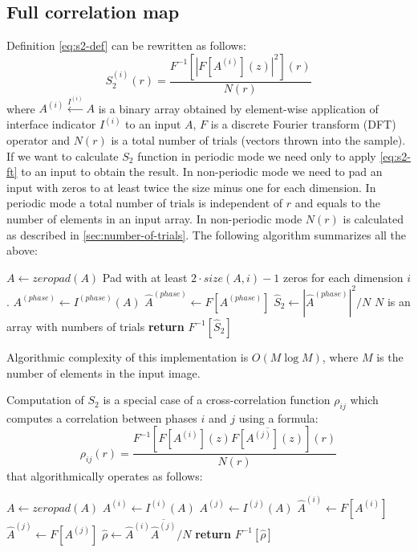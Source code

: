 \documentclass[1p]{elsarticle}
\begin{document}
\subsection{Full correlation map}
\label{sec:map}
Definition \cref{eq:s2-def} can be rewritten as follows:
\begin{equation}
  S_2^{(i)}(r) = \frac{F^{-1} [|F [A^{(i)}](z)|^2] (r)}{N(r)} \label{eq:s2-ft}
\end{equation}
where $A^{(i)} \xleftarrow{I^{(i)}} A$ is a binary array obtained by element-wise
application of interface indicator $I^{(i)}$ to an input $A$, $F$ is a discrete
Fourier transform (DFT) operator and $N(r)$ is a total number of trials (vectors
thrown into the sample). If we want to calculate $S_2$ function in periodic mode
we need only to apply \cref{eq:s2-ft} to an input to obtain the result. In
non-periodic mode we need to pad an input with zeros to at least twice the size
minus one for each dimension. In periodic mode a total number of trials is
independent of $r$ and equals to the number of elements in an input array. In
non-periodic mode $N(r)$ is calculated as described in
\cref{sec:number-of-trials}. The following algorithm summarizes all the above:
\begin{algorithmic}[1]
  \State $A \gets zeropad(A)$
  \Comment Pad with at least $2\cdot size(A, i) - 1$ zeros for each dimension $i$.
  \EndIf
  \State $A^{(phase)} \gets I^{(phase)} (A)$
  \State $\hat{A}^{(phase)} \gets F[A^{(phase)}]$
  \State $\hat{S}_2 \gets |\hat{A}^{(phase)}|^2 / N$
  \Comment $N$ is an array with numbers of trials
  \State \textbf{return} $F^{-1} [\hat{S}_2]$
  \EndProcedure
\end{algorithmic}
Algorithmic complexity of this implementation is $O(M \log M)$, where $M$ is the
number of elements in the input image.

Computation of $S_2$ is a special case of a cross-correlation function $\rho_{ij}$
which computes a correlation between phases $i$ and $j$ using a formula:
\begin{equation}
  \rho_{ij}(r) = \frac{F^{-1} [F[A^{(i)}](z) \overline{F[A^{(j)}](z)}] (r)}{N(r)} \label{eq:cross-ft}
\end{equation}
that algorithmically operates as follows:
\begin{algorithmic}[1]
    \State $A \gets zeropad(A)$
  \EndIf
  \State $A^{(i)} \gets I^{(i)} (A)$
  \State $A^{(j)} \gets I^{(j)} (A)$
  \State $\hat{A}^{(i)} \gets F[A^{(i)}]$
  \State $\hat{A}^{(j)} \gets F[A^{(j)}]$
  \State $\hat{\rho} \gets \hat{A}^{(i)} \overline{\hat{A}^{(j)}} / N$
  \State \textbf{return} $F^{-1} [\hat{\rho}]$
  \EndProcedure
\end{algorithmic}
\end{document}
